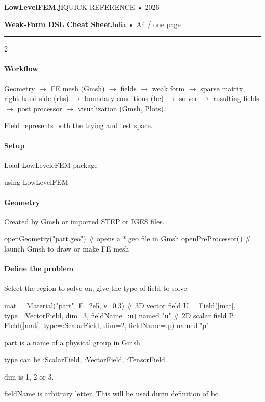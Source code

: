 \documentclass[a4paper,11pt]{extarticle}
\begin{document}
{\color{blue}\fontsize{17}{19}\selectfont\bfseries LowLevelFEM.jl}\hfill {\color{gray}\small QUICK REFERENCE • 2026}\par
{\large\bfseries Weak-Form DSL Cheat Sheet}\hfill\small Julia • A4 / one page\par
\vspace{1mm}\hrule\vspace{2mm}
\begin{multicols}{2}
	
	
\paragraph{Workflow} Geometry $\to$ FE mesh (Gmsh) $\to$ fields $\to$ weak form $\to$ sparse matrix, right hand side (rhs) $\to$ boundary conditions (bc) $\to$ solver $\to$ rusulting fields $\to$ post processor $\to$ visualization (Gmsh, Plots).

Field represents both the trying and test space.
\paragraph{Setup} Load LowLeveleFEM package
\begin{julia}
using LowLevelFEM
\end{julia}
%
\paragraph{Geometry} Created by Gmsh or imported STEP or IGES files.
\begin{julia}
openGeometry("part.geo") # opens a *.geo file in Gmsh
openPreProcessor()       # launch Gmsh to draw or make FE mesh
\end{julia}
%
\paragraph{Define the problem} Select the region to solve on, give the type of field to solve
\begin{julia}
mat = Material("part". E=2e5, ν=0.3)
# 3D vector field
U = Field([mat], type=:VectorField, dim=3, fieldName=:u) named "u"
# 2D scalar field
P = Field([mat], type=:ScalarField, dim=2, fieldName=:p) named "p"
\end{julia}
part is a name of a physical group in Gmsh.

type can be :ScalarField, :VectorField, :TensorField.

dim is 1, 2 or 3.

fieldName is arbitrary letter. This will be used durin definition of bc.
%

\end{multicols}
\end{document}
